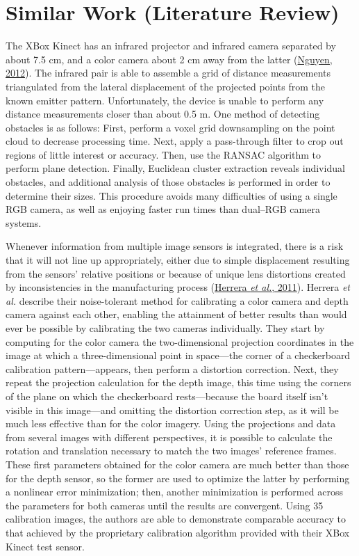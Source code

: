 \documentclass[12pt]{report}
\begin{document}
\section{Similar Work (Literature Review)}
The XBox Kinect has an infrared projector and infrared camera separated by about 7.5 cm, and a color camera about 2 cm away from the latter (\hyperref[bib:nguyen]{Nguyen, 2012}).  The infrared pair is able to assemble a grid of distance measurements triangulated from the lateral displacement of the projected points from the known emitter pattern.  Unfortunately, the device is unable to perform any distance measurements closer than about 0.5 m.  One method of detecting obstacles is as follows:  First, perform a voxel grid downsampling on the point cloud to decrease processing time.  Next, apply a pass-through filter to crop out regions of little interest or accuracy.  Then, use the RANSAC algorithm to perform plane detection.  Finally, Euclidean cluster extraction reveals individual obstacles, and additional analysis of those obstacles is performed in order to determine their sizes.  This procedure avoids many difficulties of using a single RGB camera, as well as enjoying faster run times than dual--RGB camera systems.

Whenever information from multiple image sensors is integrated, there is a risk that it will not line up appropriately, either due to simple displacement resulting from the sensors' relative positions or because of unique lens distortions created by inconsistencies in the manufacturing process (\hyperref[bib:herrera]{Herrera \textit{et al.}, 2011}).  Herrera \textit{et al.} describe their noise-tolerant method for calibrating a color camera and depth camera against each other, enabling the attainment of better results than would ever be possible by calibrating the two cameras individually.  They start by computing for the color camera the two-dimensional projection coordinates in the image at which a three-dimensional point in space---the corner of a checkerboard calibration pattern---appears, then perform a distortion correction.  Next, they repeat the projection calculation for the depth image, this time using the corners of the plane on which the checkerboard rests---because the board itself isn't visible in this image---and omitting the distortion correction step, as it will be much less effective than for the color imagery.  Using the projections and data from several images with different perspectives, it is possible to calculate the rotation and translation necessary to match the two images' reference frames.  These first parameters obtained for the color camera are much better than those for the depth sensor, so the former are used to optimize the latter by performing a nonlinear error minimization; then, another minimization is performed across the parameters for both cameras until the results are convergent.  Using 35 calibration images, the authors are able to demonstrate comparable accuracy to that achieved by the proprietary calibration algorithm provided with their XBox Kinect test sensor.
\end{document}
